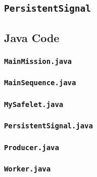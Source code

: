 \begin{landscape}
\begin{multicols}{2}

\section{\texorpdfstring{\texttt{PersistentSignal}}{PersistentSignal}}
\label{PersistentSignal-code-section}

\subsection{Java Code}
\label{PersistentSignal-java-code-subsection}

\subsubsection{\texttt{MainMission.java}}


\subsubsection{\texttt{MainSequence.java}}


\subsubsection{\texttt{MySafelet.java}}


\subsubsection{\texttt{PersistentSignal.java}}


\subsubsection{\texttt{Producer.java}}


\subsubsection{\texttt{Worker.java}}



\end{multicols}
\end{landscape}
